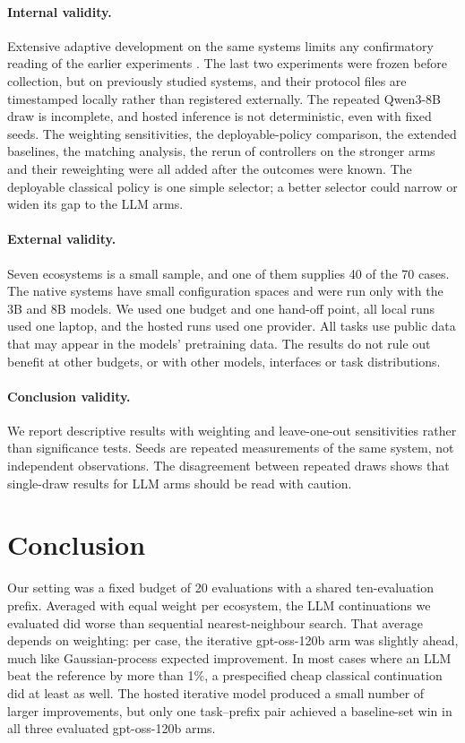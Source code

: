 \paragraph{Internal validity.} Extensive adaptive development on the same systems limits any confirmatory reading of the earlier experiments \cite{gelman2014forking}. The last two experiments were frozen before collection, but on previously studied systems, and their protocol files are timestamped locally rather than registered externally. The repeated Qwen3-8B draw is incomplete, and hosted inference is not deterministic, even with fixed seeds. The weighting sensitivities, the deployable-policy comparison, the extended baselines, the matching analysis, the rerun of controllers on the stronger arms and their reweighting were all added after the outcomes were known. The deployable classical policy is one simple selector; a better selector could narrow or widen its gap to the LLM arms.

\paragraph{External validity.} Seven ecosystems is a small sample, and one of them supplies 40 of the 70 cases. The native systems have small configuration spaces and were run only with the 3B and 8B models. We used one budget and one hand-off point, all local runs used one laptop, and the hosted runs used one provider. All tasks use public data that may appear in the models' pretraining data. The results do not rule out benefit at other budgets, or with other models, interfaces or task distributions.

\paragraph{Conclusion validity.} We report descriptive results with weighting and leave-one-out sensitivities rather than significance tests. Seeds are repeated measurements of the same system, not independent observations. The disagreement between repeated draws shows that single-draw results for LLM arms should be read with caution.

\section{Conclusion}

Our setting was a fixed budget of 20 evaluations with a shared ten-evaluation prefix. Averaged with equal weight per ecosystem, the LLM continuations we evaluated did worse than sequential nearest-neighbour search. That average depends on weighting: per case, the iterative gpt-oss-120b arm was slightly ahead, much like Gaussian-process expected improvement. In most cases where an LLM beat the reference by more than 1\%, a prespecified cheap classical continuation did at least as well. The hosted iterative model produced a small number of larger improvements, but only one task--prefix pair achieved a baseline-set win in all three evaluated gpt-oss-120b arms.

